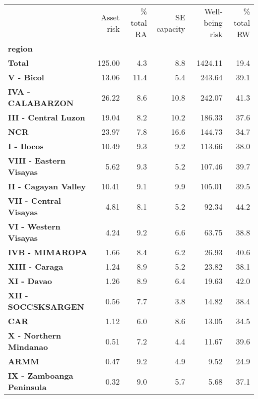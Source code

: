 \begin{tabular}{lrrrrr}
\toprule
{} &  Asset risk &  \% total RA &  SE capacity &  Well-being risk &  \% total RW \\
\textbf{region                  } &             &             &              &                  &             \\
\midrule
\textbf{Total                   } &      125.00 &         4.3 &          8.8 &          1424.11 &        19.4 \\
\textbf{V - Bicol               } &       13.06 &        11.4 &          5.4 &           243.64 &        39.1 \\
\textbf{IVA - CALABARZON        } &       26.22 &         8.6 &         10.8 &           242.07 &        41.3 \\
\textbf{III - Central Luzon     } &       19.04 &         8.2 &         10.2 &           186.33 &        37.6 \\
\textbf{NCR                     } &       23.97 &         7.8 &         16.6 &           144.73 &        34.7 \\
\textbf{I - Ilocos              } &       10.49 &         9.3 &          9.2 &           113.66 &        38.0 \\
\textbf{VIII - Eastern Visayas  } &        5.62 &         9.3 &          5.2 &           107.46 &        39.7 \\
\textbf{II - Cagayan Valley     } &       10.41 &         9.1 &          9.9 &           105.01 &        39.5 \\
\textbf{VII - Central Visayas   } &        4.81 &         8.1 &          5.2 &            92.34 &        44.2 \\
\textbf{VI - Western Visayas    } &        4.24 &         9.2 &          6.6 &            63.75 &        38.8 \\
\textbf{IVB - MIMAROPA          } &        1.66 &         8.4 &          6.2 &            26.93 &        40.6 \\
\textbf{XIII - Caraga           } &        1.24 &         8.9 &          5.2 &            23.82 &        38.1 \\
\textbf{XI - Davao              } &        1.26 &         8.9 &          6.4 &            19.63 &        42.0 \\
\textbf{XII - SOCCSKSARGEN      } &        0.56 &         7.7 &          3.8 &            14.82 &        38.4 \\
\textbf{CAR                     } &        1.12 &         6.0 &          8.6 &            13.05 &        34.5 \\
\textbf{X - Northern Mindanao   } &        0.51 &         7.2 &          4.4 &            11.67 &        39.6 \\
\textbf{ARMM                    } &        0.47 &         9.2 &          4.9 &             9.52 &        24.9 \\
\textbf{IX - Zamboanga Peninsula} &        0.32 &         9.0 &          5.7 &             5.68 &        37.1 \\
\bottomrule
\end{tabular}
